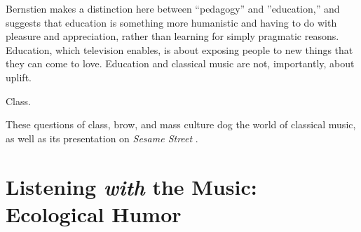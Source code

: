\documentclass[12pt,letterpaper]{article}
\newcommand{\ses}{\textit{Sesame Street }}
\begin{document}
	Bernstien makes a distinction here between ``pedagogy'' and 
	''education,'' and suggests that education is something more humanistic 
	and having to do with pleasure and appreciation, rather than learning for
	simply pragmatic reasons. Education, which television enables, is about
	exposing people to new things that they can come to love. Education and
	classical music are not, importantly, about uplift.    

	Class. 




	These questions of class, brow, and mass culture dog the world of
	classical music, as well as its presentation on \ses.



	
	

	\newpage
	\section*{Listening \textit{with} the Music: Ecological Humor} 

	
\newpage
\printbibliography
\end{document}
